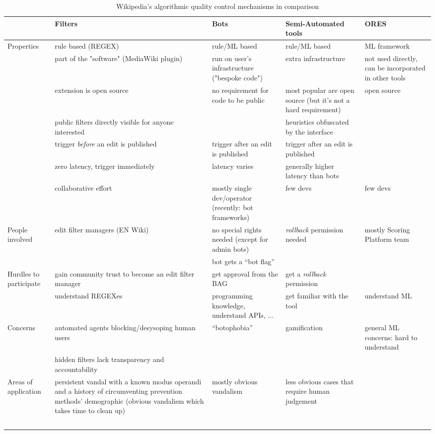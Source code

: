 \begin{landscape}
    \begin{longtable}{ | p{3cm} | p{4.5cm} | p{4.5cm} | p{4.5cm} | p{4.5cm} | }
    \hline
               & Filters & Bots & Semi-Automated tools & ORES \\
    \hline
    \multirow{7}{*}{Properties} &  rule based (REGEX) & rule/ML based & rule/ML based & ML framework \\
                               &  part of the "software" (MediaWiki plugin)  &  run on user's infrastructure ("bespoke code") & extra infrastructure & not used directly, can be incorporated in other tools \\
                               & extension is open source & no requirement for code to be public & most popular are open source (but it's not a hard requirement) & open source \\
                               & public filters directly visible for anyone interested & & heuristics obfuscated by the interface & \\
                               & trigger \emph{before} an edit is published & trigger after an edit is published & trigger after an edit is published & \\
                               & zero latency, trigger immediately & latency varies & generally higher latency than bots & \\
                               & collaborative effort & mostly single dev/operator (recently: bot frameworks) & few devs & few devs \\
    \hline
    \multirow{2}{*}{People involved} & edit filter managers (EN Wiki) & no special rights needed (except for admin bots) & \emph{rollback} permission needed & mostly Scoring Platform team \\
                                     & & bot gets a ``bot flag'' & & \\
    \hline
        \multirow{2}{*}{Hurdles to participate} & gain community trust to become an edit filter manager & get approval from the BAG & get a \emph{rollback} permission& \\
                                            & understand REGEXes & programming knowledge, understand APIs, ... & get familiar with the tool & understand ML \\
    \hline
        \multirow{2}{*}{Concerns} & automated agents blocking/desysoping human users & ``botophobia'' & gamification & general ML concerns: hard to understand \\
                                  & hidden filters lack transparency and accountability & & & \\
    \hline
        Areas of application & persistent vandal with a known modus operandi and a history of circumventing prevention methods' demographic (obvious vandalism which takes time to clean up) & mostly obvious vandalism & less obvious cases that require human judgement & \\
    \hline
    \caption{Wikipedia's algorithmic quality control mechanisms in comparison}~\label{table:mechanisms-comparison}
\end{longtable}
\end{landscape}

